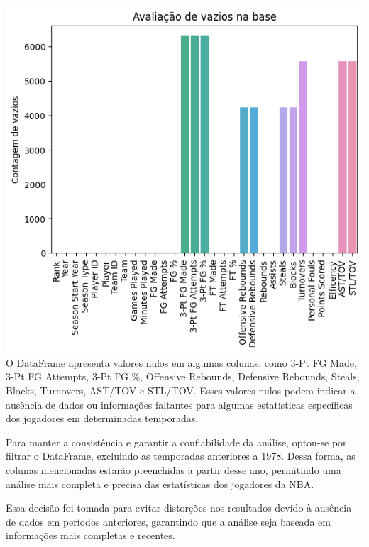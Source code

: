 \documentclass[
]{book}
\begin{document}
\includegraphics{imagens/1.png}
O DataFrame apresenta valores nulos em algumas colunas, como 3-Pt FG Made, 3-Pt FG Attempts, 3-Pt FG \%, Offensive Rebounds, Defensive Rebounds, Steals, Blocks, Turnovers, AST/TOV e STL/TOV. Esses valores nulos podem indicar a ausência de dados ou informações faltantes para algumas estatísticas específicas dos jogadores em determinadas temporadas.

Para manter a consistência e garantir a confiabilidade da análise, optou-se por filtrar o DataFrame, excluindo as temporadas anteriores a 1978. Dessa forma, as colunas mencionadas estarão preenchidas a partir desse ano, permitindo uma análise mais completa e precisa das estatísticas dos jogadores da NBA.

Essa decisão foi tomada para evitar distorções nos resultados devido à ausência de dados em períodos anteriores, garantindo que a análise seja baseada em informações mais completas e recentes.
\end{document}
